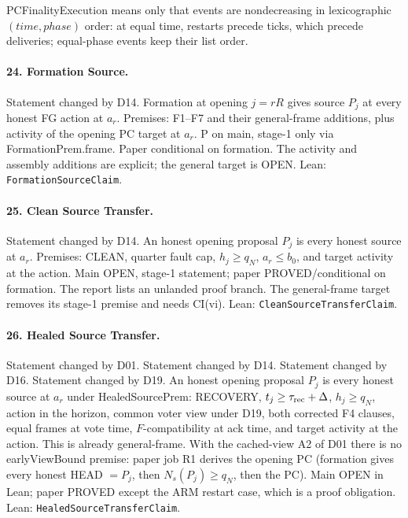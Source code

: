 \documentclass{article}
\newcommand{\nm}[1]{\nolinkurl{#1}}
\begin{document}
PCFinalityExecution means only that events are nondecreasing in
lexicographic $(\mathit{time},\mathit{phase})$ order: at equal time,
restarts precede ticks, which precede deliveries; equal-phase events
keep their list order.

\paragraph{24. Formation Source.}
Statement changed by D14.
Formation at opening $j=rR$ gives source $P_j$ at every honest FG action at $a_r$. Premises: F1--F7 and their general-frame additions, plus activity of the opening PC target at $a_r$. P on main, stage-1 only via FormationPrem.frame. Paper conditional on formation. The activity and assembly additions are explicit; the general target is OPEN.
Lean: \nm{FormationSourceClaim}.

\paragraph{25. Clean Source Transfer.}
Statement changed by D14.
An honest opening proposal $P_j$ is every honest source at $a_r$. Premises: CLEAN, quarter fault cap, $h_j\geq q_N$, $a_r\leq b_0$, and target activity at the action. Main OPEN, stage-1 statement; paper PROVED/conditional on formation. The report lists an unlanded proof branch. The general-frame target removes its stage-1 premise and needs CI(vi).
Lean: \nm{CleanSourceTransferClaim}.

\paragraph{26. Healed Source Transfer.}
Statement changed by D01. Statement changed by D14. Statement changed by D16.
Statement changed by D19.
An honest opening proposal $P_j$ is every honest source at $a_r$ under HealedSourcePrem: RECOVERY, $t_j\geq\tau_{\rm rec}+\Delta$, $h_j\geq q_N$, action in the horizon, common voter view under D19, both corrected F4 clauses, equal frames at vote time, $F$-compatibility at ack time, and target activity at the action. This is already general-frame. With the cached-view A2 of D01 there is no earlyViewBound premise: paper job R1 derives the opening PC (formation gives every honest HEAD $=P_j$, then $N_s(P_j)\geq q_N$, then the PC). Main OPEN in Lean; paper PROVED except the ARM restart case, which is a proof obligation.
Lean: \nm{HealedSourceTransferClaim}.
\end{document}
